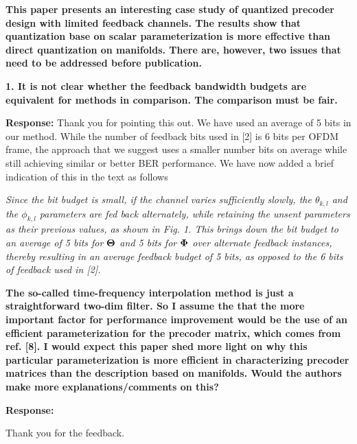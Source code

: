 \documentclass[12pt]{letter}
\begin{document}
\textbf{This paper presents an interesting case study of quantized
  precoder design with limited feedback channels. The results show
  that quantization base on scalar parameterization is more effective
  than direct quantization on manifolds. There are, however, two
  issues that need to be addressed before publication.}

\textbf{1. It is not clear whether the feedback bandwidth budgets are
equivalent for methods in comparison. The comparison must be fair.}

\textbf{Response:} Thank you for pointing this out. We have used an
average of 5 bits in our method. While the number of feedback bits
used in [2] is 6 bits per OFDM frame, the approach that we suggest
uses a smaller number bits on average while still achieving similar or
better BER performance. We have now added a brief indication of this
in the text as follows

\emph{Since the bit budget is small, if the channel varies
sufficiently slowly, the $\theta_{k,l}$ and the $\phi_{k,l}$ parameters
are fed back alternately, while retaining the unsent parameters as
their previous values, as shown in
Fig. 1. This brings down the bit budget to an average of 5 bits for
$\bf{\Theta}$ and 5 bits for $\bf{\Phi}$ over alternate feedback
instances, thereby resulting in an average feedback budget of 5 bits,
as opposed to the 6 bits of feedback used
in [2].}

\textbf{ The so-called time-frequency interpolation method is just a
  straightforward two-dim filter. So I assume the that the more
  important factor for performance improvement would be the use of an
  efficient parameterization for the precoder matrix, which comes from
  ref. [8]. I would expect this paper shed more light on why this
  particular parameterization is more efficient in characterizing
  precoder matrices than the description based on manifolds.  Would
  the authors make more explanations/comments on this?}

\textbf{Response:}

Thank you for the feedback. 
\end{document}
